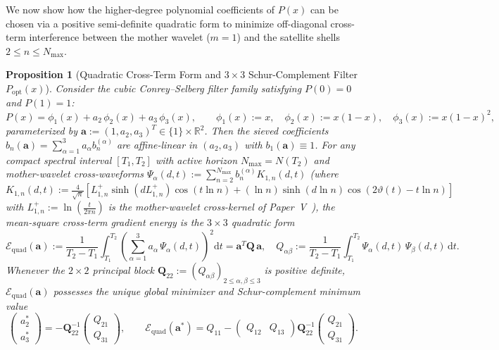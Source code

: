 \documentclass[11pt,reqno]{amsart}
\newtheorem{proposition}[theorem]{Proposition}
\theoremstyle{definition}
\theoremstyle{remark}
\numberwithin{equation}{section}
\newcommand{\R}{\mathbb{R}}
\newcommand{\dd}{\mathrm{d}}
\begin{document}
We now show how the higher-degree polynomial coefficients of $P(x)$ can be chosen via a positive semi-definite quadratic form to minimize off-diagonal cross-term interference between the mother wavelet ($m = 1$) and the satellite shells $2 \le n \le N_{\max}$.

\begin{proposition}[Quadratic Cross-Term Form and $3\times 3$ Schur-Complement Filter $P_{\mathrm{opt}}(x)$]\label{prop:schur_filter}
Consider the cubic Conrey--Selberg filter family satisfying $P(0) = 0$ and $P(1) = 1$:
\begin{equation}\label{eq:Conrey_cubic_family}
P(x) = \phi_1(x) + a_2\,\phi_2(x) + a_3\,\phi_3(x), \qquad \phi_1(x) := x, \quad \phi_2(x) := x(1-x), \quad \phi_3(x) := x(1-x)^2,
\end{equation}
parameterized by $\mathbf{a} := (1, a_2, a_3)^T \in \{1\} \times \R^2$. Then the sieved coefficients $b_n(\mathbf{a}) = \sum_{\alpha=1}^3 a_\alpha b_n^{(\alpha)}$ are affine-linear in $(a_2, a_3)$ with $b_1(\mathbf{a}) \equiv 1$. For any compact spectral interval $[T_1, T_2]$ with active horizon $N_{\max} = N(T_2)$ and mother-wavelet cross-waveforms $\Psi_\alpha(d,t) := \sum_{n=2}^{N_{\max}} b_n^{(\alpha)} K_{1,n}(d,t)$ (where $K_{1,n}(d,t) := \frac{4}{\sqrt{n}}[L_{1,n}^+\sinh(dL_{1,n}^+)\cos(t\ln n) + (\ln n)\sinh(d\ln n)\cos(2\vartheta(t) - t\ln n)]$ with $L_{1,n}^+ := \ln(\frac{t}{2\pi n})$ is the mother-wavelet cross-kernel of Paper~V~\cite{missiaen2026paper5}), the mean-square cross-term gradient energy is the $3 \times 3$ quadratic form
\begin{equation}\label{eq:E_quad_form}
\mathcal{E}_{\mathrm{quad}}(\mathbf{a}) := \frac{1}{T_2 - T_1}\int_{T_1}^{T_2} \left(\sum_{\alpha=1}^3 a_\alpha\,\Psi_\alpha(d,t)\right)^{\!2} \dd t = \mathbf{a}^T \mathbf{Q}\,\mathbf{a}, \quad Q_{\alpha\beta} := \frac{1}{T_2 - T_1}\int_{T_1}^{T_2} \Psi_\alpha(d,t)\,\Psi_\beta(d,t)\,\dd t.
\end{equation}
Whenever the $2 \times 2$ principal block $\mathbf{Q}_{22} := (Q_{\alpha\beta})_{2 \le \alpha,\beta \le 3}$ is positive definite, $\mathcal{E}_{\mathrm{quad}}(\mathbf{a})$ possesses the unique global minimizer and Schur-complement minimum value
\begin{equation}\label{eq:schur_minimizer}
\begin{pmatrix} a_2^* \\ a_3^* \end{pmatrix} = -\mathbf{Q}_{22}^{-1}\begin{pmatrix} Q_{21} \\ Q_{31} \end{pmatrix}, \qquad \mathcal{E}_{\mathrm{quad}}(\mathbf{a}^*) = Q_{11} - \begin{pmatrix} Q_{12} & Q_{13} \end{pmatrix} \mathbf{Q}_{22}^{-1} \begin{pmatrix} Q_{21} \\ Q_{31} \end{pmatrix}.

\end{equation}
\end{proposition}
\end{document}
